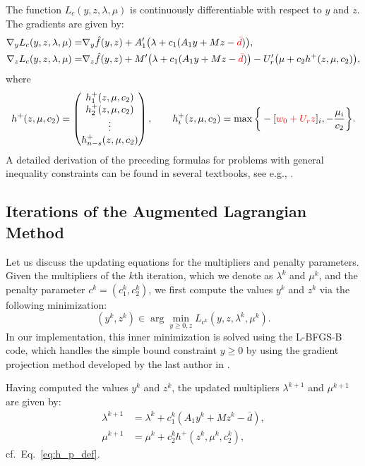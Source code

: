 \documentclass[11pt]{article}
\begin{document}
The function $L_c(y, z, \lambda, \mu)$ is continuously differentiable with respect to $y$ and $z$. The gradients are given by:
\begin{align*}
    \nabla_{y}{L}_c(y,z,\lambda,\mu)=&\nabla_{y}\hat f(y,z)+A_1'\big(\lambda+ c_1(A_1y+Mz-\textcolor{red}{\bar d})\big),\\
    \nabla_{z}{L}_c(y,z,\lambda,\mu)=&\nabla_{z}\hat f(y,z)+M'\big(\lambda+c_1(A_1y+Mz-\textcolor{red}{\bar d})\big)-
    U_r'\big(\mu+c_2h^+(z,\mu,c_2)\big),
\end{align*}
where
\begin{equation}
\label{eq:h_p_def}
    h^+(z,\mu,c_2)=\begin{pmatrix}
        h_1^+(z,\mu,c_2)\\
        h_2^+(z,\mu,c_2)\\
        \vdots\\
        h_{n-s}^+(z,\mu,c_2)
    \end{pmatrix},\qquad h_i^+(z,\mu,c_2)=\max\bigg\{-[\textcolor{red}{w_0+U_rz}]_i,-\frac{\mu_i}{c_2}\bigg\}.
\end{equation}
A detailed derivation of the preceding formulas for problems with general inequality constraints can be found in several textbooks, see e.g., \cite[Chapter 3]{Ber82a}.


\subsection{Iterations of the Augmented Lagrangian Method}
\label{sec:alm_iterations}
Let us discuss the updating equations for the multipliers and penalty parameters. Given the multipliers of the $k$th iteration, which we denote as $\lambda^k$ and $\mu^k$, and the penalty parameter $c^k = (c_1^k, c_2^k)$, we first compute the values $y^k$ and $z^k$ via the following minimization:
\begin{equation}
    \label{eq:inner_iteration}
    (y^k, z^k) \in \arg \min_{y \geq 0, z} L_{c^k}(y, z, \lambda^k, \mu^k).
\end{equation}
In our implementation, this inner minimization is solved using the L-BFGS-B code, which handles the simple bound constraint $y \geq 0$ by using the gradient projection method developed by the last author in \cite[Section~1.5]{Ber82a}.

Having computed the values $y^k$ and $z^k$, the updated multipliers $\lambda^{k+1}$ and $\mu^{k+1}$ are given by:
\begin{equation}
    \label{eq:multiplier_update}
    \begin{aligned}
        \lambda^{k+1} &= \lambda^k + c_1^k (A_1 y^k + M z^k - \bar d), \\
    \mu^{k+1} &= \mu^k + c_2^k h^+(z^k, \mu^k, c_2^k),
    \end{aligned}
\end{equation}
cf.\ Eq.~\eqref{eq:h_p_def}.
\end{document}
